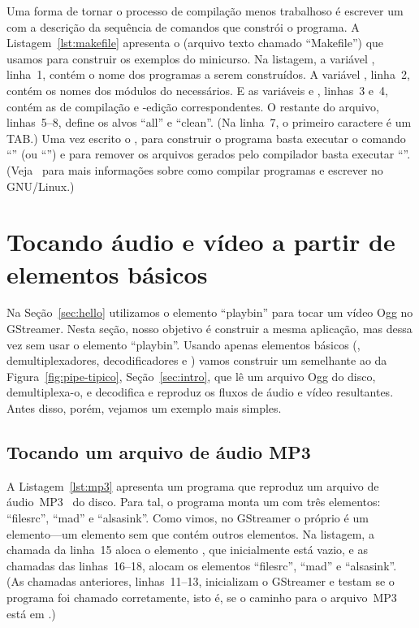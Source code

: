 \documentclass{SBCbookchapter}
\begin{document}
Uma forma de tornar o processo de compilação menos trabalhoso é escrever um
 com a descrição da sequência de comandos que constrói o
programa.  A Listagem~\ref{lst:makefile} apresenta o  (arquivo
texto chamado ``Makefile'') que usamos para construir os exemplos do
minicurso.  Na listagem, a variável , linha~1, contém o nome dos
programas a serem construídos.  A variável , linha~2, contém os
nomes dos módulos do  necessários.  E as variáveis 
e , linhas~3 e~4, contém as  de compilação e
-edição correspondentes.  O restante do arquivo, linhas~5--8,
define os alvos ``all'' e ``clean''.  (Na linha~7, o primeiro caractere é um
TAB\null.)  Uma vez escrito o , para construir o programa basta
executar o comando ``'' (ou ``'') e para remover os
arquivos gerados pelo compilador basta executar ``''.
(Veja~\cite{Gough-B-J-2005,Mecklenburg-R-2005} para mais informações sobre
como compilar programas e escrever  no GNU/Linux.)




\section{Tocando áudio e vídeo a partir de elementos básicos}
\label{sec:dissec}

Na Seção~\ref{sec:hello} utilizamos o elemento ``playbin'' para tocar um
vídeo Ogg no GStreamer.  Nesta seção, nosso objetivo é construir a mesma
aplicação, mas dessa vez sem usar o elemento ``playbin''.  Usando apenas
elementos básicos (, demultiplexadores, decodificadores e
) vamos construir um  semelhante ao da
Figura~\ref{fig:pipe-tipico}, Seção~\ref{sec:intro}, que lê um arquivo Ogg
do disco, demultiplexa-o, e decodifica e reproduz os fluxos de áudio e vídeo
resultantes.  Antes disso, porém, vejamos um exemplo mais simples.


\subsection*{Tocando um arquivo de áudio MP3}

A Listagem~\ref{lst:mp3} apresenta um programa que reproduz um arquivo de
áudio~MP3~\cite{mp3} do disco.  Para tal, o programa monta um 
com três elementos: ``filesrc'', ``mad'' e ``alsasink''.  Como vimos, no
GStreamer o próprio  é um elemento---um elemento sem 
que contém outros elementos.  Na listagem, a chamada da linha~15 aloca o
elemento , que inicialmente está vazio, e as chamadas das
linhas~16--18, alocam os elementos ``filesrc'', ``mad'' e ``alsasink''.  (As
chamadas anteriores, linhas~11--13, inicializam o GStreamer e testam se o
programa foi chamado corretamente, isto é, se o caminho para o arquivo~MP3
está em .)
\end{document}
